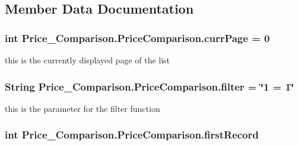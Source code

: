 \subsection{Member Data Documentation}
\hypertarget{class_price___comparison_1_1_price_comparison_a36b71cb32784ebb0101e4281f0cb211f}{
\subsubsection[{curr\-Page}]{\setlength{\rightskip}{0pt plus 5cm}int Price\-\_\-\-Comparison.\-Price\-Comparison.\-curr\-Page = 0\hspace{0.3cm}{\ttfamily [static]}}}\label{class_price___comparison_1_1_price_comparison_a36b71cb32784ebb0101e4281f0cb211f}
this is the currently displayed page of the list \hypertarget{class_price___comparison_1_1_price_comparison_a358772462e797f3672e8d5b6113a82d7}{
\subsubsection[{filter}]{\setlength{\rightskip}{0pt plus 5cm}String Price\-\_\-\-Comparison.\-Price\-Comparison.\-filter = \char`\"{}1 = 1\char`\"{}\hspace{0.3cm}{\ttfamily [static]}}}\label{class_price___comparison_1_1_price_comparison_a358772462e797f3672e8d5b6113a82d7}
this is the parameter for the filter function \hypertarget{class_price___comparison_1_1_price_comparison_a52d476d2b6219286b1a8ff308284e95e}{
\subsubsection[{first\-Record}]{\setlength{\rightskip}{0pt plus 5cm}int Price\-\_\-\-Comparison.\-Price\-Comparison.\-first\-Record\hspace{0.3cm}{\ttfamily [static]}}}\label{class_price___comparison_1_1_price_comparison_a52d476d2b6219286b1a8ff308284e95e}
